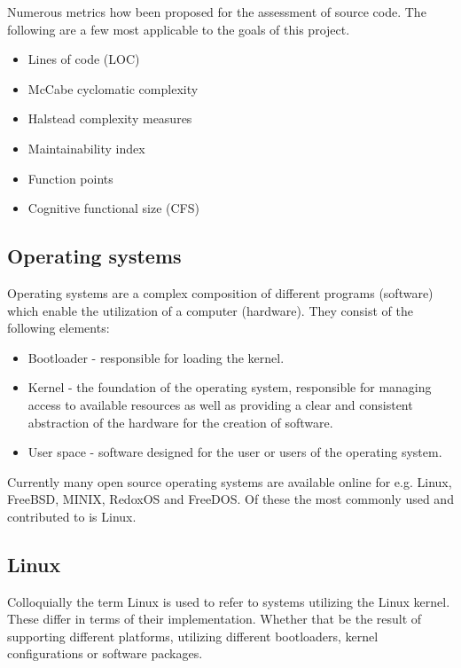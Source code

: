 Numerous metrics how been proposed for the assessment of source code.
The following are a few most applicable to the goals of this project.

\begin{itemize}
    \item Lines of code (LOC)
    \item McCabe cyclomatic complexity
    \item Halstead complexity measures
    \item Maintainability index
    \item Function points
    \item Cognitive functional size (CFS)
\end{itemize}

\subsection{Operating systems}

Operating systems are a complex composition of different programs (software) which enable the utilization of a computer (hardware). They consist of the following elements:

\begin{itemize}
    \item Bootloader - responsible for loading the kernel.
    \item Kernel - the foundation of the operating system, responsible for managing access to available resources as well as providing a clear and consistent abstraction of the hardware for the creation of software.
    \item User space - software designed for the user or users of the operating system.
\end{itemize}

Currently many open source operating systems are available online for e.g. Linux, FreeBSD, MINIX, RedoxOS and FreeDOS. Of these the most commonly used and contributed to is Linux.

\subsection{Linux}

Colloquially the term Linux is used to refer to systems utilizing the Linux kernel. These differ in terms of their implementation. Whether that be the result of supporting different platforms, utilizing different bootloaders, kernel configurations or software packages.

